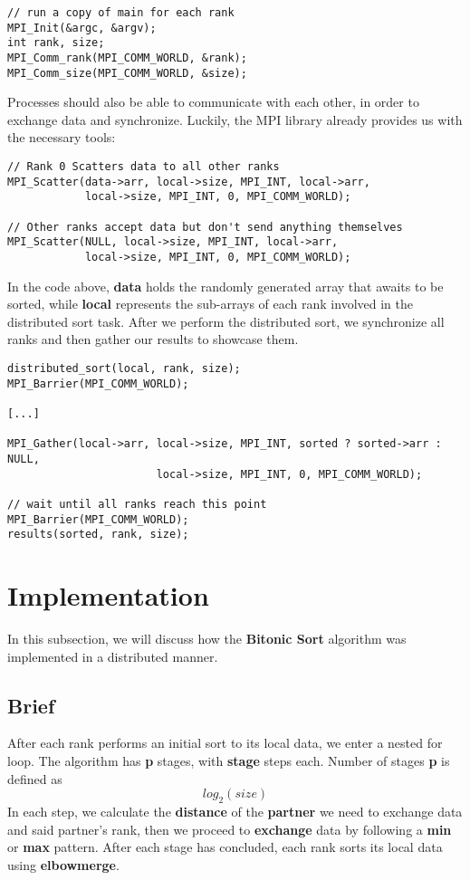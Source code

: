 \documentclass[12pt]{report}
\begin{document}
\begin{lstlisting}[style=cstyle]
// run a copy of main for each rank
MPI_Init(&argc, &argv);
int rank, size;
MPI_Comm_rank(MPI_COMM_WORLD, &rank);
MPI_Comm_size(MPI_COMM_WORLD, &size);
\end{lstlisting}

Processes should also be able to communicate with each other, in order to exchange data and synchronize. Luckily, the MPI library already provides us with the necessary tools:
\begin{lstlisting}[style=cstyle]
// Rank 0 Scatters data to all other ranks
MPI_Scatter(data->arr, local->size, MPI_INT, local->arr,
            local->size, MPI_INT, 0, MPI_COMM_WORLD);

// Other ranks accept data but don't send anything themselves
MPI_Scatter(NULL, local->size, MPI_INT, local->arr, 
            local->size, MPI_INT, 0, MPI_COMM_WORLD);
\end{lstlisting}

In the code above, \textbf{data} holds the randomly generated array that awaits to be sorted, while \textbf{local} represents the sub-arrays of each rank involved in the distributed sort task. 
After we perform the distributed sort, we synchronize all ranks and then gather our results to showcase them.

\begin{lstlisting}[style=cstyle]
distributed_sort(local, rank, size);
MPI_Barrier(MPI_COMM_WORLD);

[...]

MPI_Gather(local->arr, local->size, MPI_INT, sorted ? sorted->arr : NULL, 
                       local->size, MPI_INT, 0, MPI_COMM_WORLD);

// wait until all ranks reach this point
MPI_Barrier(MPI_COMM_WORLD);
results(sorted, rank, size);
\end{lstlisting}
\newpage
\section{Implementation}

In this subsection, we will discuss how the \textbf{Bitonic Sort} algorithm was implemented in a distributed manner. 

\subsection{Brief}

After each rank performs an initial sort to its local data, we enter a nested for loop. The algorithm has \textbf{p} stages, with \textbf{stage} steps each. Number of stages \textbf{p} is defined as 
$$
log_2(size)
$$
In each step, we calculate the \textbf{distance} of the \textbf{partner} we need to exchange data and said partner's rank, then we proceed to \textbf{exchange} data by following a \textbf{min} or \textbf{max} pattern. After each stage has concluded, each rank sorts its local data using \textbf{elbowmerge}.
\end{document}
